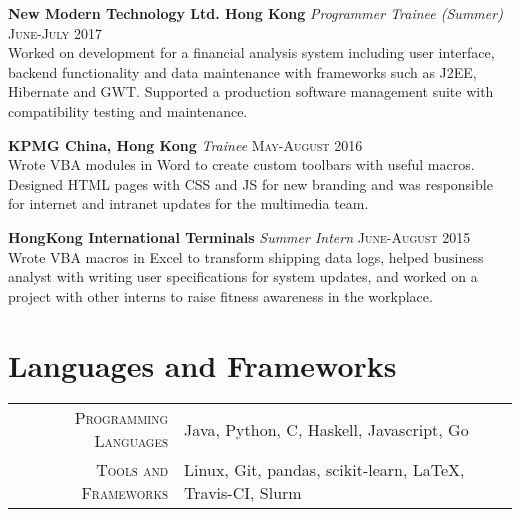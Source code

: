 \documentclass{article}
\begin{document}
\textbf{New Modern Technology Ltd. Hong Kong} \textit{Programmer Trainee (Summer)}
\hfill
\textsc{June-July 2017} \\
Worked on development for a financial analysis system including user interface,
backend functionality and data maintenance with frameworks such as J2EE, Hibernate and GWT.
Supported a production software management suite with compatibility testing and maintenance.
\newline

\textbf{KPMG China, Hong Kong} \textit{Trainee}
\hfill
\textsc{May-August 2016} \\
Wrote VBA modules in Word to create custom toolbars with useful macros.
Designed HTML pages with CSS and JS for new branding and was responsible for
internet and intranet updates for the multimedia team.
\newline

\textbf{HongKong International Terminals} \textit{Summer Intern}
\hfill
\textsc{June-August 2015} \\
Wrote VBA macros in Excel to transform shipping data logs, helped business analyst
with writing user specifications for system updates, and worked on a project with other
interns to raise fitness awareness in the workplace.


\section*{Languages and Frameworks}
\begin{tabular}{r|p{15cm}}
\textsc{Programming Languages} & Java, Python, C, Haskell, Javascript, Go\\

\textsc{Tools and Frameworks} & Linux, Git, pandas, scikit-learn, \LaTeX, Travis-CI, Slurm %
\end{tabular}

\end{document}
